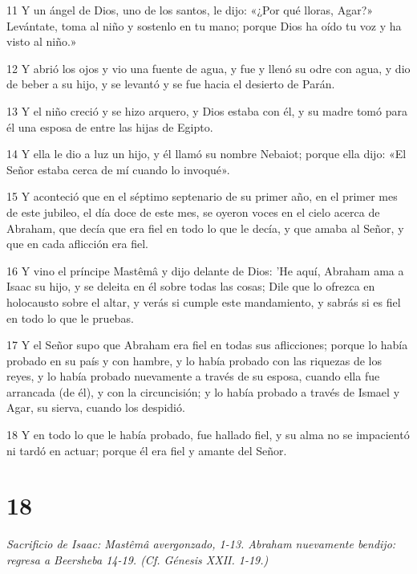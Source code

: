 \par 11 Y un ángel de Dios, uno de los santos, le dijo: «¿Por qué lloras, Agar?» Levántate, toma al niño y sostenlo en tu mano; porque Dios ha oído tu voz y ha visto al niño.»
\par 12 Y abrió los ojos y vio una fuente de agua, y fue y llenó su odre con agua, y dio de beber a su hijo, y se levantó y se fue hacia el desierto de Parán.
\par 13 Y el niño creció y se hizo arquero, y Dios estaba con él, y su madre tomó para él una esposa de entre las hijas de Egipto.
\par 14 Y ella le dio a luz un hijo, y él llamó su nombre Nebaiot; porque ella dijo: «El Señor estaba cerca de mí cuando lo invoqué».
\par 15 Y aconteció que en el séptimo septenario de su primer año, en el primer mes de este jubileo, el día doce de este mes, se oyeron voces en el cielo acerca de Abraham, que decía que era fiel en todo lo que le decía, y que amaba al Señor, y que en cada aflicción era fiel.
\par 16 Y vino el príncipe Mastêmâ y dijo delante de Dios: 'He aquí, Abraham ama a Isaac su hijo, y se deleita en él sobre todas las cosas; Dile que lo ofrezca en holocausto sobre el altar, y verás si cumple este mandamiento, y sabrás si es fiel en todo lo que le pruebas.
\par 17 Y el Señor supo que Abraham era fiel en todas sus aflicciones; porque lo había probado en su país y con hambre, y lo había probado con las riquezas de los reyes, y lo había probado nuevamente a través de su esposa, cuando ella fue arrancada (de él), y con la circuncisión; y lo había probado a través de Ismael y Agar, su sierva, cuando los despidió.
\par 18 Y en todo lo que le había probado, fue hallado fiel, y su alma no se impacientó ni tardó en actuar; porque él era fiel y amante del Señor.

\chapter{18}

\par \textit{Sacrificio de Isaac: Mastêmâ avergonzado, 1-13. Abraham nuevamente bendijo: regresa a Beersheba 14-19. (Cf. Génesis XXII. 1-19.)}

